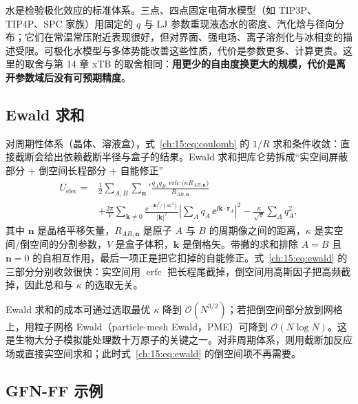 水是检验极化效应的标准体系。三点、四点固定电荷水模型（如 TIP3P、TIP4P、SPC 家族）用固定的 $q$ 与 LJ 参数重现液态水的密度、汽化焓与径向分布；它们在常温常压附近表现很好，但对界面、强电场、离子溶剂化与冰相变的描述受限。可极化水模型与多体势能改善这些性质，代价是参数更多、计算更贵。这里的取舍与第 14 章 xTB 的取舍相同：\textbf{用更少的自由度换更大的规模，代价是离开参数域后没有可预期精度}。

\subsection{Ewald 求和}
\label{ch:15:sec:ewald}

对周期性体系（晶体、溶液盒），式~\eqref{ch:15:eq:coulomb} 的 $1/R$ 求和条件收敛：直接截断会给出依赖截断半径与盒子的结果。Ewald 求和把库仑势拆成“实空间屏蔽部分 + 倒空间长程部分 + 自能修正”\citep{ewald1921}
\begin{equation}
\begin{aligned}
U_{\mathrm{elec}}
={}& \tfrac12\sum_{A,B}\sum_{\mathbf{n}}{}' \frac{q_A q_B\,
   \operatorname{erfc}\bigl(\kappa R_{AB,\mathbf{n}}\bigr)}{R_{AB,\mathbf{n}}}\\
&+ \frac{2\pi}{V}\sum_{\mathbf{k}\neq 0}
   \frac{\ee^{-\lvert\mathbf{k}\rvert^2/(4\kappa^2)}}{\lvert\mathbf{k}\rvert^2}
   \left\lvert\sum_A q_A\,\ee^{\ii\mathbf{k}\cdot\mathbf{r}_A}\right\rvert^2
- \frac{\kappa}{\sqrt{\pi}}\sum_A q_A^2,
\end{aligned}
\label{ch:15:eq:ewald}
\end{equation}
其中 $\mathbf{n}$ 是晶格平移矢量，$R_{AB,\mathbf{n}}$ 是原子 $A$ 与 $B$ 的周期像之间的距离，$\kappa$ 是实空间/倒空间的分割参数，$V$ 是盒子体积，$\mathbf{k}$ 是倒格矢。带撇的求和排除 $A=B$ 且 $\mathbf{n}=0$ 的自相互作用，最后一项正是把它扣掉的自能修正。式~\eqref{ch:15:eq:ewald} 的三部分分别收敛很快：实空间用 $\operatorname{erfc}$ 把长程尾截掉，倒空间用高斯因子把高频截掉，因此总和与 $\kappa$ 的选取无关。

Ewald 求和的成本可通过选取最优 $\kappa$ 降到 $\mathcal{O}(N^{3/2})$；若把倒空间部分放到网格上，用粒子网格 Ewald（particle-mesh Ewald，PME）可降到 $\mathcal{O}(N\log N)$。这是生物大分子模拟能处理数十万原子的关键之一。对非周期体系，则用截断加反应场或直接实空间求和；此时式~\eqref{ch:15:eq:ewald} 的倒空间项不再需要。

\subsection{GFN-FF 示例}
\label{ch:15:sec:gfnff}

